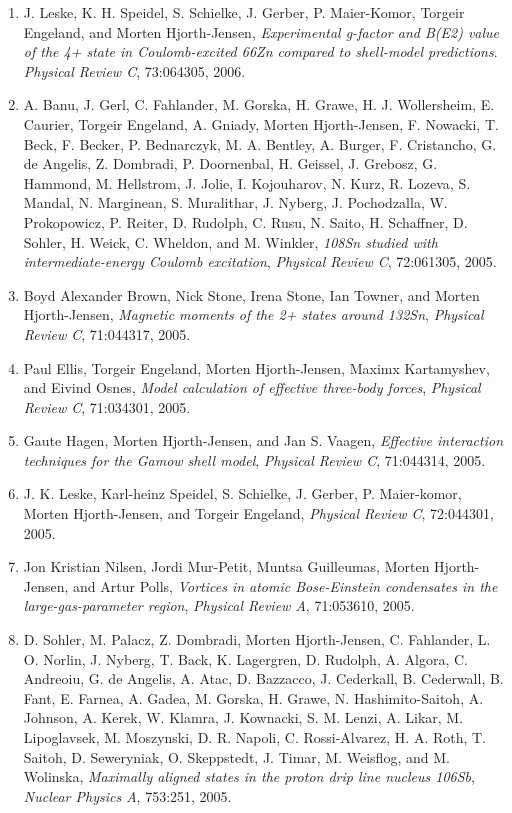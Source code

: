 \documentclass[a4wide,10pt]{article}
\begin{document}
\begin{enumerate}
\item J. Leske, K. H. Speidel, S. Schielke, J. Gerber, P. Maier-Komor, Torgeir   Engeland, and Morten Hjorth-Jensen,  \emph{Experimental g-factor and B(E2) value of the 4+ state in Coulomb-excited 66Zn compared to shell-model predictions}.  \emph{Physical Review C}, 73:064305, 2006.   

\item A. Banu, J. Gerl, C. Fahlander, M. Gorska, H. Grawe, H. J. Wollersheim,   E. Caurier, Torgeir Engeland, A. Gniady, Morten Hjorth-Jensen, F. Nowacki,   T. Beck, F. Becker, P. Bednarczyk, M. A. Bentley, A. Burger, F. Cristancho,   G. de Angelis, Z. Dombradi, P. Doornenbal, H. Geissel, J. Grebosz,   G. Hammond, M. Hellstrom, J. Jolie, I. Kojouharov, N. Kurz, R. Lozeva,   S. Mandal, N. Marginean, S. Muralithar, J. Nyberg, J. Pochodzalla,   W. Prokopowicz, P. Reiter, D. Rudolph, C. Rusu, N. Saito, H. Schaffner,   D. Sohler, H. Weick, C. Wheldon, and M. Winkler,  \emph{108Sn studied with intermediate-energy Coulomb excitation},  \emph{Physical Review C}, 72:061305, 2005. 

\item Boyd Alexander Brown, Nick Stone, Irena Stone, Ian Towner, and Morten Hjorth-Jensen,  \emph{Magnetic moments of the 2+ states around 132Sn},  \emph{Physical Review C}, 71:044317, 2005. 

\item Paul Ellis, Torgeir Engeland, Morten Hjorth-Jensen, Maximx Kartamyshev, and   Eivind Osnes, \emph{Model calculation of effective three-body forces},   \emph{Physical Review C}, 71:034301, 2005. 

\item Gaute Hagen, Morten Hjorth-Jensen, and Jan S. Vaagen, \emph{Effective interaction techniques for the Gamow shell model},  \emph{Physical Review C}, 71:044314, 2005. 

\item J. K. Leske, Karl-heinz Speidel, S. Schielke, J. Gerber, P. Maier-komor, Morten   Hjorth-Jensen, and Torgeir Engeland,  \emph{Physical Review C}, 72:044301, 2005. 

\item Jon Kristian Nilsen, Jordi Mur-Petit, Muntsa Guilleumas, Morten Hjorth-Jensen,   and Artur Polls,  \emph{Vortices in atomic Bose-Einstein condensates in the  large-gas-parameter region},  \emph{Physical Review A}, 71:053610, 2005. 

\item D. Sohler, M. Palacz, Z. Dombradi, Morten Hjorth-Jensen, C. Fahlander, L. O.   Norlin, J. Nyberg, T. Back, K. Lagergren, D. Rudolph, A. Algora, C. Andreoiu,   G. de Angelis, A. Atac, D. Bazzacco, J. Cederkall, B. Cederwall, B. Fant,   E. Farnea, A. Gadea, M. Gorska, H. Grawe, N. Hashimito-Saitoh, A. Johnson,   A. Kerek, W. Klamra, J. Kownacki, S. M. Lenzi, A. Likar, M. Lipoglavsek,   M. Moszynski, D. R. Napoli, C. Rossi-Alvarez, H. A. Roth, T. Saitoh,   D. Seweryniak, O. Skeppstedt, J. Timar, M. Weisflog, and M. Wolinska, \emph{Maximally aligned states in the proton drip line nucleus 106Sb},  \emph{Nuclear Physics A}, 753:251, 2005. 


\end{enumerate}
\end{document}
